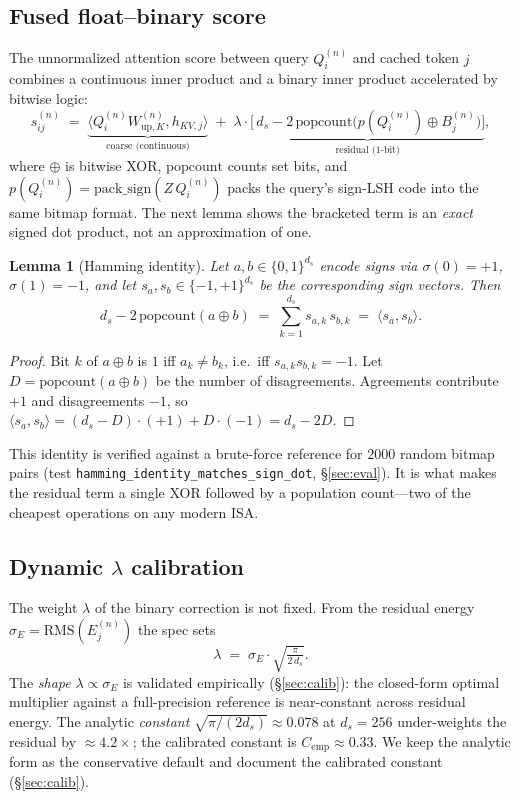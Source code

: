 \documentclass[11pt]{article}
\theoremstyle{plain}
\newtheorem{lemma}{Lemma}
\theoremstyle{definition}
\newcommand{\ds}{d_s}
\newcommand{\sigE}{\sigma_E}
\newcommand{\inner}[2]{\langle #1, #2 \rangle}
\newcommand{\popc}{\mathrm{popcount}}
\newcommand{\rms}{\mathrm{RMS}}
\begin{document}
\subsection{Fused float--binary score}
The unnormalized attention score between query $Q_i^{(n)}$ and cached
token $j$ combines a continuous inner product and a binary inner product
accelerated by bitwise logic:
\begin{equation}
  s_{ij}^{(n)} \;=\;
  \underbrace{\inner{Q_i^{(n)} W_{\text{up},K}^{(n)}}{h_{KV,j}}}_{\text{coarse (continuous)}}
  \;+\;
  \lambda \cdot
  \underbrace{\Big[\,\ds - 2\,\popc\big(p(Q_i^{(n)}) \oplus B_j^{(n)}\big)\Big]}_{\text{residual (1-bit)}},
  \label{eq:score}
\end{equation}
where $\oplus$ is bitwise XOR, $\popc$ counts set bits, and
$p(Q_i^{(n)}) = \mathrm{pack\_sign}(Z\,Q_i^{(n)})$ packs the query's
sign-LSH code into the same bitmap format. The next lemma shows the
bracketed term is an \emph{exact} signed dot product, not an
approximation of one.

\begin{lemma}[Hamming identity]
\label{lem:hamming}
Let $a,b \in \{0,1\}^{\ds}$ encode signs via $\sigma(0)=+1$,
$\sigma(1)=-1$, and let $s_a, s_b \in \{-1,+1\}^{\ds}$ be the
corresponding sign vectors. Then
\begin{equation}
  \ds - 2\,\popc(a \oplus b) \;=\; \sum_{k=1}^{\ds} s_{a,k}\, s_{b,k}
  \;=\; \inner{s_a}{s_b}.
\end{equation}
\end{lemma}
\begin{proof}
Bit $k$ of $a \oplus b$ is $1$ iff $a_k \neq b_k$, i.e.\ iff
$s_{a,k} s_{b,k} = -1$. Let $D = \popc(a\oplus b)$ be the number of
disagreements. Agreements contribute $+1$ and disagreements $-1$, so
$\inner{s_a}{s_b} = (\ds - D)\cdot(+1) + D\cdot(-1) = \ds - 2D$.
\end{proof}

This identity is verified against a brute-force reference for $2000$
random bitmap pairs (test \texttt{hamming\_identity\_matches\_sign\_dot},
\S\ref{sec:eval}). It is what makes the residual term a single XOR
followed by a population count---two of the cheapest operations on any
modern ISA.

\subsection{Dynamic $\lambda$ calibration}
\label{sec:lambda}
The weight $\lambda$ of the binary correction is not fixed. From the
residual energy $\sigE = \rms(E_j^{(n)})$ the spec sets
\begin{equation}
  \lambda \;=\; \sigE \cdot \sqrt{\tfrac{\pi}{2\,\ds}}.
  \label{eq:lambda}
\end{equation}
The \emph{shape} $\lambda \propto \sigE$ is validated empirically
(\S\ref{sec:calib}): the closed-form optimal multiplier against a
full-precision reference is near-constant across residual energy. The
analytic \emph{constant} $\sqrt{\pi/(2\ds)} \approx 0.078$ at $\ds=256$
under-weights the residual by $\approx 4.2\times$; the calibrated
constant is $C_{\text{emp}} \approx 0.33$. We keep the analytic form as
the conservative default and document the calibrated constant
(\S\ref{sec:calib}).
\end{document}
